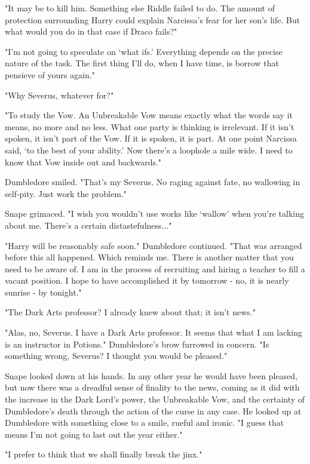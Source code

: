 \documentclass[a4paper,11pt]{article}
\begin{document}
"It may be to kill him. Something else Riddle failed to do. The amount of protection surrounding Harry could explain Narcissa's fear for her son's life. But what would you do in that case if Draco fails?"

"I'm not going to speculate on `what ifs.' Everything depends on the precise nature of the task. The first thing I'll do, when I have time, is borrow that pensieve of yours again."

"Why Severus, whatever for?"

"To study the Vow. An Unbreakable Vow means exactly what the words say it means, no more and no less. What one party is thinking is irrelevant. If it isn't spoken, it isn't part of the Vow. If it is spoken, it is part. At one point Narcissa said, `to the best of your ability.' Now there's a loophole a mile wide. I need to know that Vow inside out and backwards."

Dumbledore smiled. "That's my Severus. No raging against fate, no wallowing in self-pity. Just work the problem."

Snape grimaced. "I wish you wouldn't use works like `wallow' when you're talking about me. There's a certain distastefulness..."

"Harry will be reasonably safe soon." Dumbledore continued. "That was arranged before this all happened. Which reminds me. There is another matter that you need to be aware of. I am in the process of recruiting and hiring a teacher to fill a vacant position. I hope to have accomplished it by tomorrow - no, it is nearly sunrise - by tonight."

"The Dark Arts professor? I already knew about that; it isn't news."

"Alas, no, Severus. I have a Dark Arts professor. It seems that what I am lacking is an instructor in Potions." Dumbledore's brow furrowed in concern. "Is something wrong, Severus? I thought you would be pleased."

Snape looked down at his hands. In any other year he would have been pleased, but now there was a dreadful sense of finality to the news, coming as it did with the increase in the Dark Lord's power, the Unbreakable Vow, and the certainty of Dumbledore's death through the action of the curse in any case. He looked up at Dumbledore with something close to a smile, rueful and ironic. "I guess that means I'm not going to last out the year either."

"I prefer to think that we shall finally break the jinx."
\end{document}

